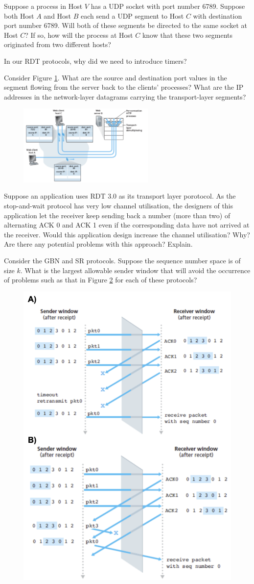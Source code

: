 
\question Suppose a process in Host $V$ has a UDP socket with port number 6789. 
Suppose both Host $A$ and Host $B$ each send a UDP segment to Host $C$ with destination port number 6789.
Will both of these segments be directed to the same socket at Host $C$?
If so, how will the process at Host $C$ know that these two segments originated from two different hosts?

\question In our RDT protocols, why did we need to introduce timers?

\question Consider Figure \ref{fig:prac-3-1}.
What are the source and destination port values in the segment flowing from the server back to the clients' processes?
What are the IP addresses in the network-layer datagrams carrying the transport-layer segments?

\begin{figure}
    \centering
    \includegraphics[width=0.6\textwidth]{images/prac-3-1.png}
    \caption{}
    \label{fig:prac-3-1}
\end{figure}

\question Suppose an application uses RDT 3.0 as its transport layer porotocol. As the stop-and-wait protocol has very low channel utilisation, the designers of this application let the receiver keep sending back a number (more than two) of alternating ACK 0 and ACK 1 even if the corresponding data have not arrived at the receiver.
Would this application design increase the channel utilisation? Why?
Are there any potential problems with this approach? Explain.

\question Consider the GBN and SR protocols.
Suppose the sequence number space is of size $k$.
What is the largest allowable sender window that will avoid the occurrence of problems such as that in Figure \ref{fig:prac-3-2} for each of these protocols?

\begin{figure}
    \centering
    \includegraphics[width=0.5\linewidth]{images/prac-3-2.png}
    \caption{}
    \label{fig:prac-3-2}
\end{figure}
